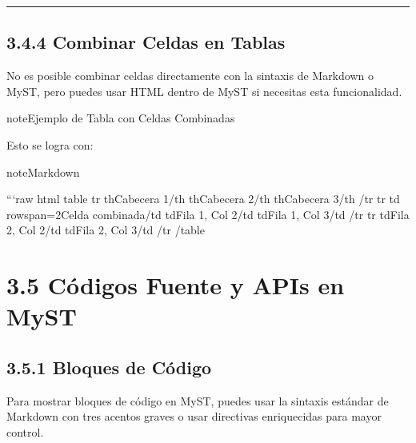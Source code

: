 \documentclass[a4paper,10pt,spanish]{sphinxmanual}
\begin{document}
\bigskip\hrule\bigskip



\subsection{3.4.4 Combinar Celdas en Tablas}
\label{\detokenize{3_guia_myst/tablas:combinar-celdas-en-tablas}}
\sphinxAtStartPar
No es posible combinar celdas directamente con la sintaxis de Markdown o MyST, pero puedes usar HTML dentro de MyST si necesitas esta funcionalidad.

\begin{sphinxadmonition}{note}{Ejemplo de Tabla con Celdas Combinadas}


\end{sphinxadmonition}

\sphinxAtStartPar
Esto se logra con:

\begin{sphinxadmonition}{note}{Markdown}

\begin{sphinxVerbatim}[commandchars=\\\{\}]
```\PYGZob{}raw\PYGZcb{} html
\PYGZlt{}table\PYGZgt{}
  \PYGZlt{}tr\PYGZgt{}
    \PYGZlt{}th\PYGZgt{}Cabecera 1\PYGZlt{}/th\PYGZgt{}
    \PYGZlt{}th\PYGZgt{}Cabecera 2\PYGZlt{}/th\PYGZgt{}
    \PYGZlt{}th\PYGZgt{}Cabecera 3\PYGZlt{}/th\PYGZgt{}
  \PYGZlt{}/tr\PYGZgt{}
  \PYGZlt{}tr\PYGZgt{}
    \PYGZlt{}td rowspan=\PYGZdq{}2\PYGZdq{}\PYGZgt{}Celda combinada\PYGZlt{}/td\PYGZgt{}
    \PYGZlt{}td\PYGZgt{}Fila 1, Col 2\PYGZlt{}/td\PYGZgt{}
    \PYGZlt{}td\PYGZgt{}Fila 1, Col 3\PYGZlt{}/td\PYGZgt{}
  \PYGZlt{}/tr\PYGZgt{}
  \PYGZlt{}tr\PYGZgt{}
    \PYGZlt{}td\PYGZgt{}Fila 2, Col 2\PYGZlt{}/td\PYGZgt{}
    \PYGZlt{}td\PYGZgt{}Fila 2, Col 3\PYGZlt{}/td\PYGZgt{}
  \PYGZlt{}/tr\PYGZgt{}
\PYGZlt{}/table\PYGZgt{}
\end{sphinxVerbatim}
\end{sphinxadmonition}

\sphinxstepscope


\section{3.5 Códigos Fuente y APIs en MyST}
\label{\detokenize{3_guia_myst/code_api:codigos-fuente-y-apis-en-myst}}\label{\detokenize{3_guia_myst/code_api::doc}}

\subsection{3.5.1 Bloques de Código}
\label{\detokenize{3_guia_myst/code_api:bloques-de-codigo}}
\sphinxAtStartPar
Para mostrar bloques de código en MyST, puedes usar la sintaxis estándar de Markdown con tres acentos graves \textasciigrave{}\textasciigrave{}\textasciigrave{}\textasciigrave{}\textasciigrave{} o usar directivas enriquecidas para mayor control.
\end{document}
